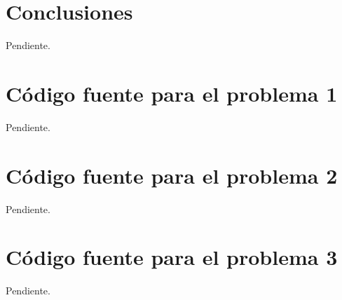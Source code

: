 \documentclass[a4paper,10pt,twoside]{article}
\begin{document}


\section{Conclusiones}

Pendiente.



\newpage

\begin{appendices}

\section{Código fuente para el problema 1}

Pendiente.




\section{Código fuente para el problema 2}

Pendiente.




\section{Código fuente para el problema 3}

Pendiente.


\end{appendices}
\end{document}

